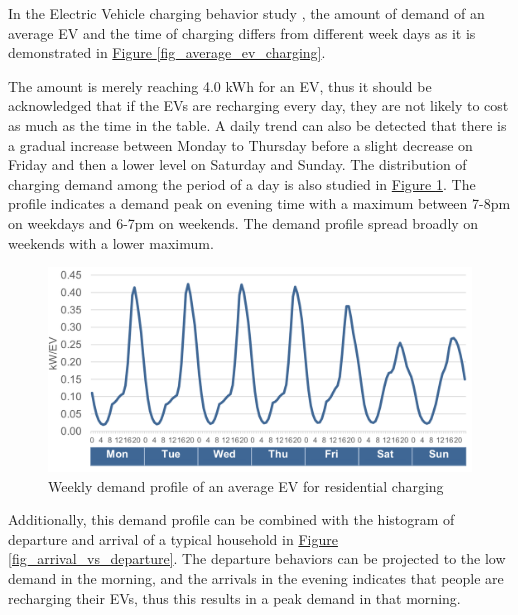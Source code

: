 \documentclass[12pt,a4paper]{report}
\begin{document}
        In the Electric Vehicle charging behavior study \cite{report:EVchargingstudy}, the amount of demand of an average EV and the time of charging differs from different week days as it is demonstrated in \hyperref[fig_average_ev_charging]{Figure \ref*{fig_average_ev_charging}}.

        The amount is merely reaching 4.0 kWh for an EV, thus it should be acknowledged that if the EVs are recharging every day, they are not likely to cost as much as the time in the table. A daily trend can also be detected that there is a gradual increase between Monday to Thursday before a slight decrease on Friday and then a lower level on Saturday and Sunday.
        The distribution of charging demand among the period of a day is also studied in \hyperref[fig_weekly_demand_profile]{Figure \ref*{fig_weekly_demand_profile}}. The profile indicates a demand peak on evening time with a maximum between 7-8pm on weekdays and 6-7pm on weekends. The demand profile spread broadly on weekends with a lower maximum.

        \begin{figure}[ht]
            \centerline{\includegraphics[scale=1]{EVchargingdistribution}}
            \caption{Weekly demand profile of an average EV for residential charging}
            \label{fig_weekly_demand_profile}
        \end{figure}

        Additionally, this demand profile can be combined with the histogram of departure and arrival of a typical household in \hyperref[fig_arrival_vs_departure]{Figure \ref*{fig_arrival_vs_departure}}. The departure behaviors can be projected to the low demand in the morning, and the arrivals in the evening indicates that people are recharging their EVs, thus this results in a peak demand in that morning.
\end{document}
